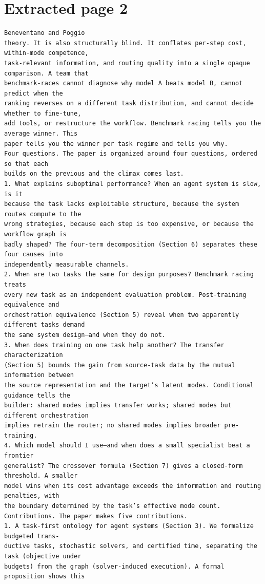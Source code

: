 \documentclass[11pt]{article}
\begin{document}
\section*{Extracted page 2}
\begin{verbatim}
Beneventano and Poggio
theory. It is also structurally blind. It conflates per-step cost, within-mode competence,
task-relevant information, and routing quality into a single opaque comparison. A team that
benchmark-races cannot diagnose why model A beats model B, cannot predict when the
ranking reverses on a different task distribution, and cannot decide whether to fine-tune,
add tools, or restructure the workflow. Benchmark racing tells you the average winner. This
paper tells you the winner per task regime and tells you why.
Four questions. The paper is organized around four questions, ordered so that each
builds on the previous and the climax comes last.
1. What explains suboptimal performance? When an agent system is slow, is it
because the task lacks exploitable structure, because the system routes compute to the
wrong strategies, because each step is too expensive, or because the workflow graph is
badly shaped? The four-term decomposition (Section 6) separates these four causes into
independently measurable channels.
2. When are two tasks the same for design purposes? Benchmark racing treats
every new task as an independent evaluation problem. Post-training equivalence and
orchestration equivalence (Section 5) reveal when two apparently different tasks demand
the same system design—and when they do not.
3. When does training on one task help another? The transfer characterization
(Section 5) bounds the gain from source-task data by the mutual information between
the source representation and the target’s latent modes. Conditional guidance tells the
builder: shared modes implies transfer works; shared modes but different orchestration
implies retrain the router; no shared modes implies broader pre-training.
4. Which model should I use—and when does a small specialist beat a frontier
generalist? The crossover formula (Section 7) gives a closed-form threshold. A smaller
model wins when its cost advantage exceeds the information and routing penalties, with
the boundary determined by the task’s effective mode count.
Contributions. The paper makes five contributions.
1. A task-first ontology for agent systems (Section 3). We formalize budgeted trans-
ductive tasks, stochastic solvers, and certified time, separating the task (objective under
budgets) from the graph (solver-induced execution). A formal proposition shows this

\end{verbatim}
\end{document}

